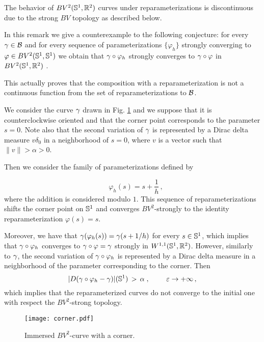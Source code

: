 The behavior of $BV^2(\mathbb{S}^1,\mathbb{R}^2)$ curves under reparameterizations is discontinuous due to the strong $BV$ topology as described below.
\begin{rem}\label{disc-metric}

In this remark we give a counterexample to the following conjecture: for every $\gamma\in \mathcal{B}$ and for every  sequence of parameterizations $\{\varphi_h \}$ strongly converging  to $\varphi\in BV^2(\mathbb{S}^1, \mathbb{S}^1)$ we obtain that $\gamma\circ\varphi_h$ strongly converges  to $\gamma\circ\varphi$  in $BV^2(\mathbb{S}^1, \mathbb{R}^2)$ .

This actually proves  that the composition with a reparameterization is not a continuous function from the set of  reparameterizations to $\mathcal{B}$.

We consider the curve $\gamma$ drawn in Fig. \ref{corner} and we suppose that it is  counterclockwise oriented and that the corner point corresponds to the parameter $s=0$. Note also that the second variation of $\gamma$ is represented by a Dirac delta measure $v\delta_0$ in a neighborhood of $s=0$, where $v$ is a vector such that $\|v\|> \alpha >0$.

Then we consider the family of parameterizations defined by

$$ \quad \varphi_h(s)=s+\frac 1 h\,,$$
where the addition is considered modulo $1$. This 
sequence of reparameterizations shifts the corner  point on $\mathbb{S}^1$ and converges $BV^2$-strongly to the identity reparameterization $\varphi(s)=s$. 

Moreover, we have that 
$\gamma(\varphi_h(s))=\gamma(s+1/h)$ for every $s\in\mathbb{S}^1$, which implies that $\gamma\circ\varphi_h$ converges to $\gamma\circ\varphi=\gamma$ strongly in $W^{1,1}(\mathbb{S}^1,\mathbb{R}^2)$.
However, similarly to $\gamma$,  the second variation  of $\gamma\circ\varphi_h$  is represented by a Dirac delta measure in a neighborhood of the parameter corresponding to the corner.  Then 
$$|D (\gamma\circ\varphi_h-\gamma)|(\mathbb{S}^1)\,>\,\alpha\;,\ \quad\quad\varepsilon \rightarrow +\infty\,,$$ which implies that  the reparameterized curves do not converge to the initial one with respect the $BV^2$-strong topology.

\begin{figure}[h!]
\centering
\texttt{[image: corner.pdf]}
\caption{\label{corner} Immersed $BV^2$-curve with a corner.}\vspace{1cm}
\end{figure}

\end{rem}  



